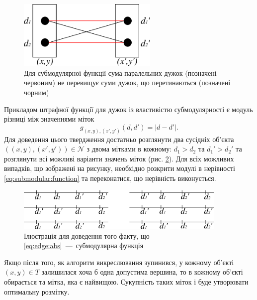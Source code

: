 \begin{figure}[h]
  \centering
  \includegraphics[width=0.6\textwidth]{images/submodular_function}
  \caption{Для субмодулярної функції сума паралельних дужок (позначені червоним)
           не перевищує суми дужок, що перетинаються (позначені чорним)}
  \label{fig:submodular:function}
\end{figure}

Прикладом штрафної функції для дужок із властивістю субмодулярності
є модуль різниці між значеннями міток
\begin{equation} \label{eq:edge:abs}
    g_{\left(x, y \right), \left(x', y' \right)} \left( d, d' \right)
    = \left| d - d' \right|.
\end{equation}
Для доведення цього твердження достатньо розглянути два сусідніх об'єкта
$\left(\left(x, y \right), \left(x', y' \right) \right) \in \mathcal{N}$
з двома мітками в кожному: $d_1 > d_2$ та $d_1' > d_2'$
та розглянути всі можливі варіанти значень міток
(рис. \ref{fig:submodularity:abs:proof}).
Для всіх можливих випадків, що зображені на рисунку,
необхідно розкрити модулі в нерівності \eqref{eq:submodular:function}
та переконатися, що нерівність виконується.

\begin{figure}[h]
  \centering
  \includegraphics[width=0.9\textwidth]{images/submodularity_abs_proof}
  \caption{Ілюстрація для доведення того факту,
           що \eqref{eq:edge:abs}~---~субмодулярна функція}
  \label{fig:submodularity:abs:proof}
\end{figure}

Якщо після того, як алгоритм викреслювання зупинився,
у кожному об'єкті $\left(x, y \right) \in T$
залишилася хоча б одна допустима вершина,
то в кожному об'єкті обирається та мітка, яка є найвищою.
Сукупність таких міток і буде утворювати оптимальну розмітку.

